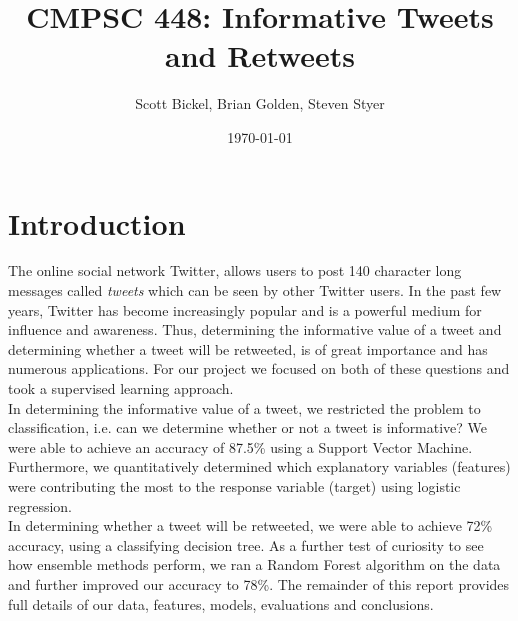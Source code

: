 \documentclass[12pt]{article}
\begin{document}
\title{CMPSC 448: Informative Tweets and Retweets}
\author{Scott Bickel, Brian Golden, Steven Styer}
\date{\today}
\maketitle
\tableofcontents
\section{Introduction}
The online social network Twitter, allows users to post 140 character long messages called {\it tweets} which can be seen by other Twitter users. In the past few years, Twitter has become increasingly popular and is a powerful medium for influence and awareness. Thus,  determining the informative value of a tweet and determining whether a tweet will be retweeted, is of great importance and has numerous applications. For our project we focused on both of these questions and took a supervised learning approach.\\
\indent
In determining the informative value of a tweet, we restricted the problem to classification, i.e. can we determine whether or not a tweet is informative? We were able to achieve an accuracy of 87.5\% using a Support Vector Machine. Furthermore, we quantitatively determined which explanatory variables (features) were contributing the most to the response variable (target) using logistic regression.\\
\indent
 In determining whether a tweet will be retweeted, we were able to achieve 72\% accuracy, using a classifying decision tree. As a further test of curiosity to see how ensemble methods perform, we ran a Random Forest algorithm on the data and further improved our accuracy to 78\%. The remainder of this report provides full details of our data, features, models, evaluations and conclusions.
\end{document}
